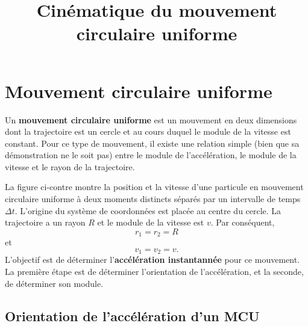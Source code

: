 \documentclass{tufte-handout}
\title{Cinématique du mouvement circulaire uniforme}
\date{}
\begin{document}
\maketitle
\vspace{0.5cm}

\section{Mouvement circulaire uniforme}

Un \textbf{mouvement circulaire uniforme} est un mouvement en deux dimensions
dont la trajectoire est un cercle et au cours duquel le module de la vitesse
est constant.  Pour ce type de mouvement, il existe une relation simple (bien
que sa démonstration ne le soit pas) entre le module de l'accélération, le
module de la vitesse et le rayon de la trajectoire.

\begin{marginfigure}
\end{marginfigure}
La figure ci-contre montre la position et la vitesse d'une particule en
mouvement circulaire uniforme à deux moments distincts séparés par un
intervalle de temps $\Delta t$.  L'origine du système de coordonnées est placée
au centre du cercle.  La trajectoire a un rayon $R$ et le module de la vitesse
est $v$.  Par conséquent,
\[
  r_1 = r_2 = R
\]
et
\[
  v_1 = v_2 = v.
\]
L'objectif est de déterminer l'\textbf{accélération instantannée} pour ce
mouvement.  La première étape est de déterminer l'orientation de
l'accélération, et la seconde, de déterminer son module.


\subsection{Orientation de l'accélération d'un MCU}
\end{document}
